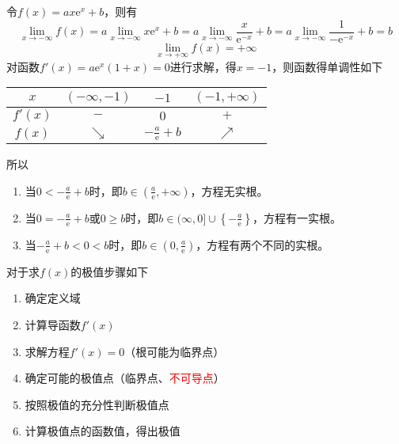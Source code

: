 \begin{solution}
    令$f(x) = ax\mathrm{e}^x+b$，则有
    \[
        \lim_{x\to-\infty}f(x)
        = a\lim_{x\to-\infty} x\mathrm{e}^x + b
        = a\lim_{x\to-\infty} \frac{x}{\mathrm{e}^{-x}} + b
        = a\lim_{x\to-\infty} \frac{1}{-\mathrm{e}^{-x}} + b
        = b
    \]
    \[
        \lim_{x\to+\infty}f(x) = +\infty
    \]
    对函数$f'(x)=a\mathrm{e}^x(1+x)=0$进行求解，得$x=-1$，则函数得单调性如下
    \begin{center}
        \begin{tabular}{|c|c|c|c|}
            \hline
            $x$     & $(-\infty,-1)$ & $-1$                      & $(-1,+\infty)$ \\ \hline
            $f'(x)$ & $-$            & $0$                       & $+$            \\ \hline
            $f(x)$  & $\searrow$     & $-\frac{a}{\mathrm{e}}+b$ & $\nearrow$     \\ \hline
        \end{tabular}
    \end{center}
    所以
    \begin{enumerate}
        \item 当$0 < -\frac{a}{\mathrm{e}}+b$时，即$b\in(\frac{a}{\mathrm{e}},+\infty)$，方程无实根。
        \item 当$0 = -\frac{a}{\mathrm{e}}+b$或$0 \geq b$时，即$b\in(\infty,0]\cup \left\{ -\frac{a}{\mathrm{e}} \right\}$，方程有一实根。
        \item 当$-\frac{a}{\mathrm{e}}+b < 0 < b$时，即$b\in(0,\frac{a}{\mathrm{e}})$，方程有两个不同的实根。
    \end{enumerate}
\end{solution}

对于求$f(x)$的极值步骤如下
\begin{enumerate}
    \item 确定定义域
    \item 计算导函数$f'(x)$
    \item 求解方程$f'(x)=0$（根可能为临界点）
    \item 确定可能的极值点（临界点、\textcolor{red}{不可导点}）
    \item 按照极值的充分性判断极值点
    \item 计算极值点的函数值，得出极值
\end{enumerate}

